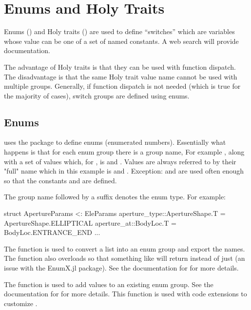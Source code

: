 \chapter{Enums and Holy Traits}
\label{c:enums}

Enums () and Holy traits () are used to define ``switches'' which are
variables whose value can be one of a set of named constants. 
A web search will provide documentation. 

The advantage of Holy traits is that they can be used with function dispatch. The disadvantage is
that the same Holy trait value name cannot be used with multiple groups. Generally, if function
dispatch is not needed (which is true for the majority of cases), switch groups are defined using enums.

\section{Enums}
\label{s:enums}

\accellat uses the package  to define enums (enumerated numbers).
Essentially what happens is that for each enum group there is a group name, For example ,
along with a set of values which, for , is  and . Values
are always referred to by their "full" name which in this example is  and
. Exception:  and  are
used often enough so that the constants  and  are defined.

The group name followed by a  suffix denotes the enum type.
For example:
\begin{example}
  struct ApertureParams <: EleParams
    aperture_type::ApertureShape.T = ApertureShape.ELLIPTICAL
    aperture_at::BodyLoc.T = BodyLoc.ENTRANCE_END
    ...
\end{example}

The  function is used to convert a list into an enum group and export the names.
The  function also overloads  so that something like  
will return  instead of just  (an issue with the EnumX.jl package). 
See the documentation for  for more details.

The  function is used to add values to an existing enum group. See the documentation for
 for more details. This function is used with code extensions to customize \accellat.

